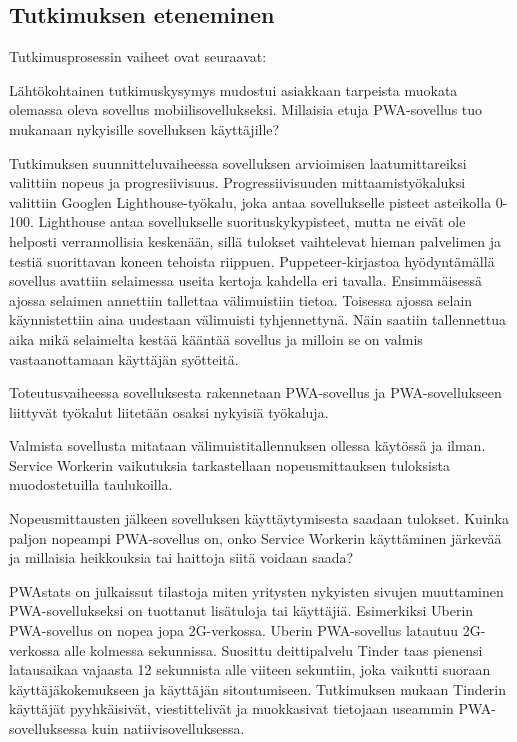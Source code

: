 \documentclass{tktltiki}
\begin{document}
\subsection{Tutkimuksen eteneminen}

Tutkimusprosessin vaiheet ovat seuraavat:

Lähtökohtainen tutkimuskysymys mudostui asiakkaan tarpeista muokata olemassa oleva sovellus mobiilisovellukseksi. Millaisia etuja PWA-sovellus tuo mukanaan nykyisille sovelluksen käyttäjille?

Tutkimuksen suunnitteluvaiheessa sovelluksen arvioimisen laatumittareiksi valittiin nopeus ja progresiivisuus. Progressiivisuuden mittaamistyökaluksi valittiin Googlen Lighthouse-työkalu, joka antaa sovellukselle pisteet asteikolla 0-100. Lighthouse antaa sovellukselle suorituskykypisteet, mutta ne eivät ole helposti verrannollisia keskenään, sillä tulokset vaihtelevat hieman palvelimen ja testiä suorittavan koneen tehoista riippuen. Puppeteer-kirjastoa hyödyntämällä sovellus avattiin selaimessa useita kertoja kahdella eri tavalla. Ensimmäisessä ajossa selaimen annettiin tallettaa välimuistiin tietoa. Toisessa ajossa selain käynnistettiin aina uudestaan välimuisti tyhjennettynä. Näin saatiin tallennettua aika mikä selaimelta kestää kääntää sovellus ja milloin se on valmis vastaanottamaan käyttäjän syötteitä. 

Toteutusvaiheessa sovelluksesta rakennetaan PWA-sovellus ja PWA-sovellukseen liittyvät työkalut liitetään osaksi nykyisiä työkaluja.

Valmista sovellusta mitataan välimuistitallennuksen ollessa käytössä ja ilman. Service Workerin vaikutuksia tarkastellaan nopeusmittauksen tuloksista muodostetuilla taulukoilla.

Nopeusmittausten jälkeen sovelluksen käyttäytymisesta saadaan tulokset. Kuinka paljon nopeampi PWA-sovellus on, onko Service Workerin käyttäminen järkevää ja millaisia heikkouksia tai haittoja siitä voidaan saada?


PWAstats \cite{PWAstats} on julkaissut tilastoja miten yritysten nykyisten sivujen muuttaminen PWA-sovellukseksi on tuottanut lisätuloja tai käyttäjiä. Esimerkiksi Uberin PWA-sovellus on nopea jopa 2G-verkossa. Uberin PWA-sovellus latautuu 2G-verkossa alle kolmessa sekunnissa. Suosittu deittipalvelu Tinder taas pienensi latausaikaa vajaasta 12 sekunnista alle viiteen sekuntiin, joka vaikutti suoraan käyttäjäkokemukseen ja käyttäjän sitoutumiseen. Tutkimuksen mukaan \cite{Osmani} Tinderin käyttäjät pyyhkäisivät, viestittelivät ja muokkasivat tietojaan useammin PWA-sovelluksessa kuin natiivisovelluksessa.
\end{document}

